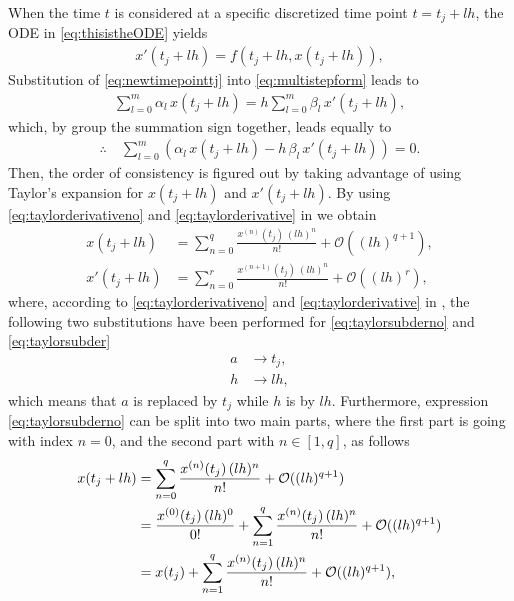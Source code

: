 \documentclass[12pt]{article}
\begin{document}
When the time $t$ is considered at a specific discretized time point $t=t_j+lh$, the ODE in \eqref{eq:thisistheODE} yields 
\begin{align}
	\label{eq:newtimepointtj}
	x'(t_j+lh) = f(t_j+lh,x(t_j+lh)),
\end{align}
Substitution of \eqref{eq:newtimepointtj} into \eqref{eq:multistepform} leads to 
\begin{align}
	\sum_{l=0}^{{m}}\alpha_l\,x(t_j+lh) = h\sum_{l=0}^{m}\beta_l\,x'(t_j+lh),
\end{align}
which, by group the summation sign together, leads equally to
\begin{align}
	\label{eq:myform}
	\therefore\quad\boxed{
	\sum_{l=0}^{{m}}\left( \alpha_l\,x(t_j+lh) - h\,\beta_l\,x'(t_j+lh) \right) = 0.
	}
\end{align}
Then, the order of consistency is figured out by taking advantage of using Taylor's expansion for 
$x(t_j+lh)$ and $x'(t_j+lh)$. By using 
\eqref{eq:taylorderivativeno} and
\eqref{eq:taylorderivative} in
 we obtain 
\begin{align}
	x(t_j+lh)  & = \sum_{n=0}^{q} \frac{x^{(n)}(t_j)\,(lh)^{n}}{n!} + \mathcal{O}((lh)^{q+1}),
	\label{eq:taylorsubderno}
	\\
	x'(t_j+lh) & = \sum_{n=0}^{r} \frac{x^{(n+1)}(t_j)\,(lh)^{n}}{n!} + \mathcal{O}((lh)^{r}),
	\label{eq:taylorsubder}
\end{align}
where, according to 
\eqref{eq:taylorderivativeno} and
\eqref{eq:taylorderivative} in
,
the following two substitutions have been performed
for 
\eqref{eq:taylorsubderno} and 
\eqref{eq:taylorsubder}
\begin{align}
	a & \rightarrow t_j, \\
	h & \rightarrow lh, 
\end{align}
which means that $a$ is replaced by $t_j$ while $h$ is by $lh$.
Furthermore, expression \eqref{eq:taylorsubderno} can be split into two main parts, 
where the first part is going with 
index $n=0$, and the second part with $n \in [1,q]$, as follows
\begin{align}
	x(t_j+lh) 
	 & = \sum_{n=0}^{q} \frac{x^{(n)}(t_j)\,(lh)^{n}}{n!} + \mathcal{O}((lh)^{q+1}) \notag    \\
	 & = \frac{x^{(0)}(t_j)\,(lh)^{0}}{0!}
	+ \sum_{n=1}^{q} \frac{x^{(n)}(t_j)\,(lh)^{n}}{n!}
	+ \mathcal{O}((lh)^{q+1}) \notag                                                          \\
	 & = x(t_j) + \sum_{n=1}^{q} \frac{x^{(n)}(t_j)\,(lh)^{n}}{n!} + \mathcal{O}((lh)^{q+1}),
\end{align}
\end{document}

